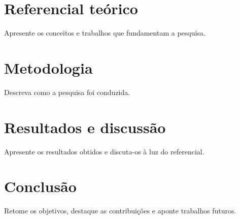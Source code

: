 \documentclass[12pt,a4paper,oneside]{book}
\begin{document}
\chapter{Referencial teórico}\label{cap:referencial}

Apresente os conceitos e trabalhos que fundamentam a pesquisa.

\chapter{Metodologia}\label{cap:metodologia}

Descreva como a pesquisa foi conduzida.

\chapter{Resultados e discussão}\label{cap:resultados}

Apresente os resultados obtidos e discuta-os à luz do referencial.

\chapter{Conclusão}\label{cap:conclusao}

Retome os objetivos, destaque as contribuições e aponte trabalhos
futuros.


\backmatter

%
\end{document}
